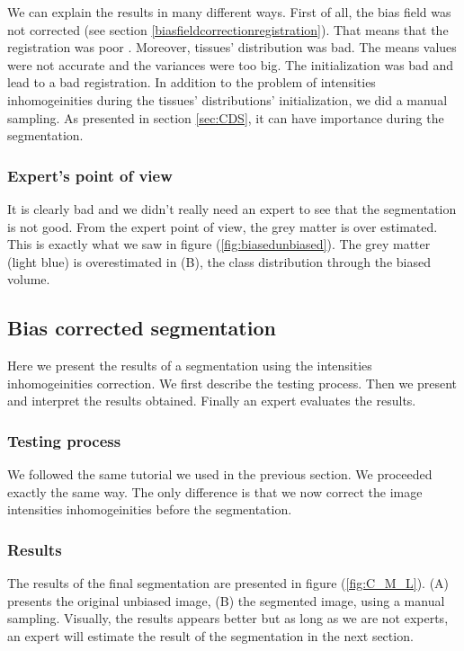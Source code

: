   \par
We can explain the results in many different ways. First of all, the bias field was not corrected (see section \ref{biasfieldcorrectionregistration}). That means that the registration was poor . Moreover, tissues' distribution was bad. The means values were not accurate and the variances were too big. The initialization was bad and lead to a bad registration. In addition to the problem of intensities inhomogeinities during the tissues' distributions' initialization, we did a manual sampling. As presented in section \ref{sec:CDS}, it can have importance during the segmentation.  
  
\subsubsection{Expert's point of view}
It is clearly bad and we didn't really need an expert to see that the segmentation is not good. From the expert point of view, the grey matter is over estimated. This is exactly what we saw in figure (\ref{fig:biasedunbiased}). The grey matter (light blue) is overestimated in (B), the class distribution through the biased volume.

\subsection{Bias corrected segmentation}
%
Here we present the results of a segmentation using the intensities inhomogeinities correction. We first describe the testing process. Then we present and interpret the results obtained. Finally an expert evaluates the results.
%
\subsubsection{Testing process}
We followed the same tutorial we used in the previous section. We proceeded exactly the same way. The only difference is that we now correct the image intensities inhomogeinities before the segmentation.

%
\subsubsection{Results}
The results of the final segmentation are presented in figure (\ref{fig:C_M_L}). (A) presents the original unbiased image, (B) the segmented image, using a manual sampling. Visually, the results appears better but as long as we are not experts, an expert will estimate the result of the segmentation in the next section.
%


